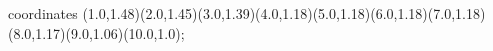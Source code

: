 					coordinates { (1.0,1.48)(2.0,1.45)(3.0,1.39)(4.0,1.18)(5.0,1.18)(6.0,1.18)(7.0,1.18)(8.0,1.17)(9.0,1.06)(10.0,1.0)};